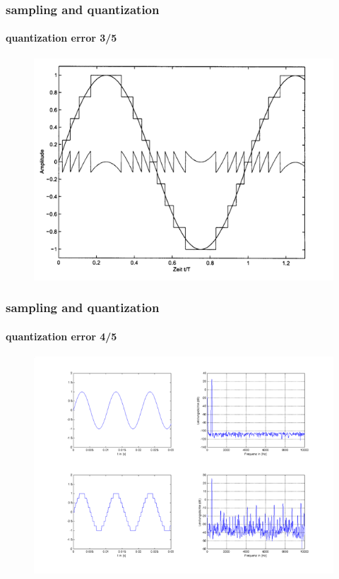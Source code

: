 	\begin{frame}\frametitle{sampling and quantization}\framesubtitle{quantization error 3/5}
		\begin{figure}
			\centering
				\includegraphics[scale=.6]{Graph/quant+quanterror}
		\end{figure}
	\end{frame}		
	\begin{frame}\frametitle{sampling and quantization}\framesubtitle{quantization error 4/5}
		\begin{figure}
			\centering
				\includegraphics[scale=.6]{Graph/quanterror_spec}
		\end{figure}
	\end{frame}		
